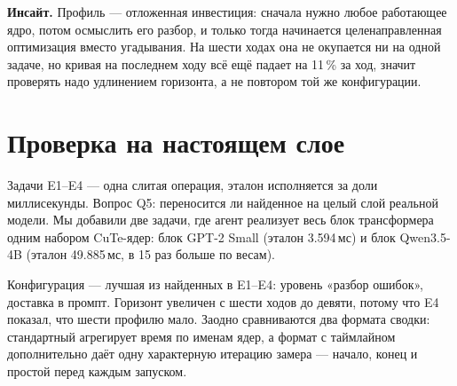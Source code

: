 \documentclass[10pt,a4paper]{article}
\newcommand{\insight}[1]{\par\smallskip\noindent\textbf{Инсайт.} #1\par\smallskip}
\begin{document}
\insight{Профиль --- отложенная инвестиция: сначала нужно любое работающее ядро, потом
осмыслить его разбор, и только тогда начинается целенаправленная оптимизация вместо
угадывания. На шести ходах она не окупается ни на одной задаче, но кривая на последнем ходу
всё ещё падает на 11\,\% за ход, значит проверять надо удлинением горизонта, а не повтором
той же конфигурации.}

\section{Проверка на настоящем слое}
\label{sec:layer}

Задачи E1--E4 --- одна слитая операция, эталон исполняется за доли миллисекунды. Вопрос Q5:
переносится ли найденное на целый слой реальной модели. Мы добавили две задачи, где агент
реализует весь блок трансформера одним набором CuTe-ядер: блок GPT-2 Small (эталон
3.594\,мс) и блок Qwen3.5-4B (эталон 49.885\,мс, в 15 раз больше по весам).

Конфигурация --- лучшая из найденных в E1--E4: уровень «разбор ошибок», доставка в промпт.
Горизонт увеличен с шести ходов до девяти, потому что E4 показал, что шести профилю мало.
Заодно сравниваются два формата сводки: стандартный агрегирует время по именам ядер, а формат
с таймлайном дополнительно даёт одну характерную итерацию замера --- начало, конец и простой
перед каждым запуском.
\end{document}
